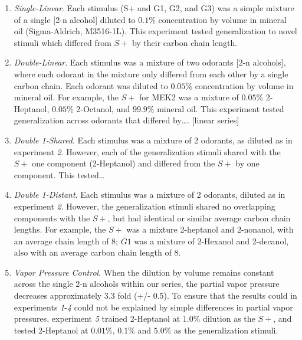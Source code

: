 \begin{enumerate}
\item \textit{Single-Linear}. Each stimulus (S+ and G1, G2, and G3) was a simple mixture of a single [2-n alcohol] diluted to $0.1\%$ concentration by volume in mineral oil (Sigma-Aldrich, M3516-1L). This experiment tested generalization to novel stimuli which differed from $S+$ by their carbon chain length.

\item \textit{Double-Linear}. Each stimulus was a mixture of two odorants [2-n alcohols], where each odorant in the mixture only differed from each other by a single carbon chain. Each odorant was diluted to $0.05\%$ concentration by volume in mineral oil. For example, the $S+$ for MEK2 was a mixture of $0.05\%$ 2-Heptanol, $0.05\%$ 2-Octanol, and $99.9\%$ mineral oil.  This experiment tested generalization across odorants that differed by…. [linear series]

\item \textit{Double 1-Shared}. Each stimulus was a mixture of 2 odorants, as diluted as in experiment \textit{2}. However, each of the generalization stimuli shared with the $S+$ one component (2-Heptanol) and differed from the $S+$ by one component. This tested…

\item \textit{Double 1-Distant}. Each stimulus was a mixture of 2 odorants, diluted as in experiment \textit{2}. However, the generalization stimuli shared no overlapping components with the $S+$, but had identical or similar average carbon chain lengths. For example, the $S+$ was a mixture 2-heptanol and 2-nonanol, with an average chain length of 8; $G1$ was a mixture of 2-Hexanol and 2-decanol, also with an average carbon chain length of 8.

\item \textit{Vapor Pressure Control}. When the dilution by volume remains constant across the single 2-n alcohols within our series, the partial vapor pressure decreases approximately 3.3 fold (+/- 0.5). To ensure that the results could in experiments \textit{1}-\textit{4} could not be explained by simple differences in partial vapor pressures, experiment \textit{5} trained 2-Heptanol at $1.0\%$ dilution as the $S+$, and tested 2-Heptanol at $0.01\%$, $0.1\%$ and $5.0\%$ as the generalization stimuli.
\end{enumerate}


